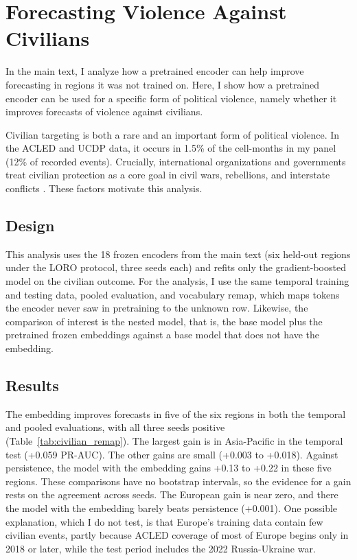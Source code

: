\documentclass[11pt, letterpaper]{article}
\begin{document}
\section{Forecasting Violence Against Civilians} 
\label{sec:civilian_case}
In the main text, I analyze how a pretrained encoder can help improve forecasting in regions it was not trained on. Here, I show how a pretrained encoder can be used for a specific form of political violence, namely whether it improves forecasts of violence against civilians. 

Civilian targeting is both a rare and an important form of political violence. In the ACLED and UCDP data, it occurs in 1.5\% of the cell-months in my panel (12\% of recorded events). Crucially, international organizations and governments treat civilian protection as a core goal in civil wars, rebellions, and interstate conflicts \citep{unsc1999res1265, hultman2013united, wiesel2019act}. These factors motivate this analysis. 



\subsection{Design}
This analysis uses the 18 frozen encoders from the main text (six held-out regions under the LORO protocol, three seeds each) and refits only the gradient-boosted model on the civilian outcome. For the analysis, I use the same temporal training and testing data, pooled evaluation, and vocabulary remap, which maps tokens the encoder never saw in pretraining to the unknown row. Likewise, the comparison of interest is the nested model, that is, the base model plus the pretrained frozen embeddings against a base model that does not have the embedding.   

\subsection{Results}
The embedding improves forecasts in five of the six regions in both the temporal and pooled evaluations, with all three seeds positive (Table~\ref{tab:civilian_remap}). The largest gain is in Asia-Pacific in the temporal test (+0.059 PR-AUC). The other gains are small (+0.003 to +0.018). Against persistence, the model with the embedding gains +0.13 to +0.22 in these five regions. These comparisons have no bootstrap intervals, so the evidence for a gain rests on the agreement across seeds. The European gain is near zero, and there the model with the embedding barely beats persistence (+0.001). One possible explanation, which I do not test, is that Europe's training data contain few civilian events, partly because ACLED coverage of most of Europe begins only in 2018 or later, while the test period includes the 2022 Russia-Ukraine war. 
\end{document}
